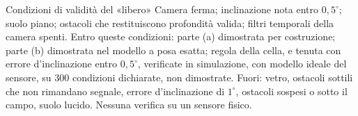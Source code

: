 \begin{riquadro}{Condizioni di validità del «libero»}
Camera ferma; inclinazione nota entro $0{,}5^\circ$; suolo piano; ostacoli che restituiscono profondità valida; filtri temporali della camera spenti. Entro queste condizioni: parte (a) dimostrata per costruzione; parte (b) dimostrata nel modello a posa esatta; regola della cella, e tenuta con errore d'inclinazione entro $0{,}5^\circ$, verificate in simulazione, con modello ideale del sensore, su 300 condizioni dichiarate, non dimostrate. Fuori: vetro, ostacoli sottili che non rimandano segnale, errore d'inclinazione di $1^\circ$, ostacoli sospesi o sotto il campo, suolo lucido. Nessuna verifica su un sensore fisico.
\end{riquadro}
